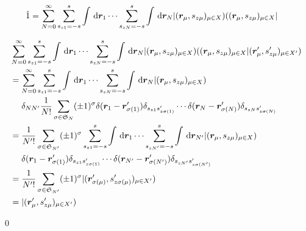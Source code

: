 \documentclass[uplatex,dvipdfmx,a4paper,11pt]{jlreq}
\makeatletter
\renewcommand{\SS}{\mathfrak{S}}
\newcommand{\rr}{\bm{r}}
\numberwithin{equation}{section}
\theoremstyle{definition}
\renewenvironment{proof}[1][\proofname]{\par
  \normalfont
  \topsep6\p@\@plus6\p@ \trivlist
  \item[\hskip\labelsep{\bfseries #1}\@addpunct{\bfseries}]\ignorespaces\quad\par
}{
  \qed\endtrivlist\@endpefalse
}
\renewcommand\proofname{証明}
\makeatother
\begin{document}
\begin{theorem}
  \begin{align}
    \hat{1} & = \sum_{N = 0}^{\infty}\sum_{s_{z1} = -s}^{s}\int\dl{\rr_1}\cdots\sum_{s_{zN} = -s}^{s}\int\dl{\rr_N}|(\rr_\mu, s_{z\mu})_{\mu\in X})((\rr_\mu, s_{z\mu})_{\mu\in X}|
  \end{align}
\end{theorem}
\begin{proof}
  \begin{align}
     & \sum_{N = 0}^{\infty}\sum_{s_{z1} = -s}^{s}\int\dl{\rr_1}\cdots\sum_{s_{zN} = -s}^{s}\int\dl{\rr_N}|(\rr_\mu, s_{z\mu})_{\mu\in X})((\rr_\mu, s_{z\mu})_{\mu\in X}|(\rr_\mu', s_{z\mu}')_{\mu\in X'}) \\
     & = \sum_{N = 0}^{\infty}\sum_{s_{z1} = -s}^{s}\int\dl{\rr_1}\cdots\sum_{s_{zN} = -s}^{s}\int\dl{\rr_N}|(\rr_\mu, s_{z\mu})_{\mu\in X})                                                                 \\
     & \quad\ \delta_{NN'}\frac{1}{N!}\sum_{\sigma\in\SS_N}(\pm 1)^\sigma\delta(\rr_1 - \rr_{\sigma(1)}')\delta_{s_{z1}s_{z\sigma(1)}'}\cdots\delta(\rr_N - \rr_{\sigma(N)}')\delta_{s_{zN}s_{z\sigma(N)}'}  \\
     & = \frac{1}{N'!}\sum_{\sigma\in\SS_{N'}}(\pm 1)^\sigma\sum_{s_{z1} = -s}^{s}\int\dl{\rr_1}\cdots\sum_{s_{zN'} = -s}^{s}\int\dl{\rr_{N'}}|(\rr_\mu, s_{z\mu})_{\mu\in X})                               \\
     & \quad\ \delta(\rr_1 - \rr_{\sigma(1)}')\delta_{s_{z1}s_{z\sigma(1)}'}\cdots\delta(\rr_{N'} - \rr_{\sigma(N')}')\delta_{s_{zN'}s_{z\sigma(N')}'}                                                       \\
     & = \frac{1}{N'!}\sum_{\sigma\in\SS_{N'}}(\pm 1)^\sigma|(\rr_{\sigma(\mu)}', s_{z\sigma(\mu)}')_{\mu\in X'})                                                                                            \\
     & = |(\rr_{\mu}', s_{z\mu}')_{\mu\in X'})
  \end{align}
\end{proof}
\end{document}
